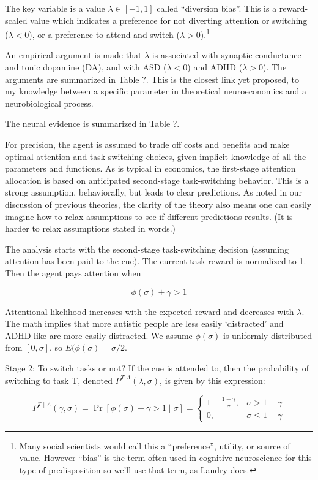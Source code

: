 \documentclass{article}
\begin{document}
The key variable is a value $\lambda \in [-1,1]$ called “diversion bias”. This is a reward-scaled value which indicates a preference for not diverting attention or switching ($\lambda<0$), or a preference to attend and switch ($\lambda>0$).\footnote{Many social scientists would call this a “preference”, utility, or source of value. However “bias” is the term often used in cognitive neuroscience for this type of predisposition so we’ll use that term, as Landry does.}

An empirical argument is made that $\lambda$ is associated with synaptic conductance and tonic dopamine (DA), and with ASD ($\lambda<0$) and ADHD ($\lambda>0$). The arguments are summarized in Table ?. This is the closest link yet proposed, to my knowledge between a specific parameter in theoretical neuroeconomics and a neurobiological process. 

The neural evidence is summarized in Table ?.  

For precision, the agent is assumed to trade off costs and benefits and make optimal attention and task-switching choices, given implicit knowledge of all the parameters and functions. As is typical in economics, the first-stage attention allocation is based on anticipated second-stage task-switching behavior. This is a strong assumption, behaviorally, but leads to clear predictions. As noted in our discussion of previous theories, the clarity of the theory also means one can easily imagine how to relax assumptions to see if different predictions results. (It is harder to relax assumptions stated in words.)

The analysis starts with the second-stage task-switching decision (assuming attention has been paid to the cue). The current task reward is normalized to 1. Then the agent pays attention when

$$
\phi(\sigma)+\gamma>1
$$

Attentional likelihood increases with the expected reward and decreases with $\lambda$. The math implies that more autistic people are less easily ‘distracted’ and ADHD-like are more easily distracted. We assume $\phi(\sigma)$ is uniformly distributed from $[0,\sigma]$, so $E(\phi(\sigma)=\sigma/2$. 
	
Stage 2: To switch tasks or not? If the cue is attended to, then the probability of switching to task T, denoted $P^{T|A}(\lambda,\sigma)$, is given by this expression: 

$$
P^{T \mid A}(\gamma, \sigma)=\operatorname{Pr}[\phi(\sigma)+\gamma>1 \mid \sigma]=\left\{\begin{array}{cl}
1-\frac{1-\gamma}{\sigma}, & \sigma>1-\gamma \\
0, & \sigma \leq 1-\gamma
\end{array}\right.
$$
\end{document}

